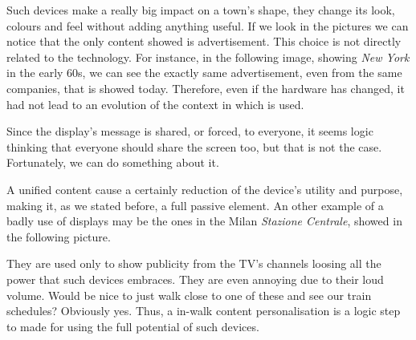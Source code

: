\documentclass[]{usiinfbachelorproject}
\begin{document}
Such devices make a really big impact on a town's shape, they change its look, colours and feel without adding anything useful. If we look in the pictures we can notice that the only content showed is advertisement. This choice is not directly related to the technology. For instance, in the following image, showing \emph{New York} in the early 60s, we can see the exactly same advertisement, even from the same companies, that is showed today. Therefore, even if the hardware has changed, it had not lead to an evolution of the context in which is used.
\begin{figure}[H]
  \centering
\end{figure}
Since the display's message is shared, or forced, to everyone, it seems logic thinking that everyone should share the screen too, but that is not the case. Fortunately, we can do something about it.

A unified content cause a certainly reduction of the device's utility and purpose, making it, as we stated before, a full passive element. An other example of a badly use of displays may be the ones in the Milan \emph{Stazione Centrale}, showed in the following picture.
\begin{figure}[H]
  \centering
\end{figure} 
They are used only to show publicity from the TV's channels loosing all the power that such devices embraces. They are even annoying due to their loud volume. Would be nice to just walk close to one of these and see our train schedules? Obviously yes. Thus, a in-walk content personalisation is a logic step to made for using the full potential of such devices.
\end{document}
